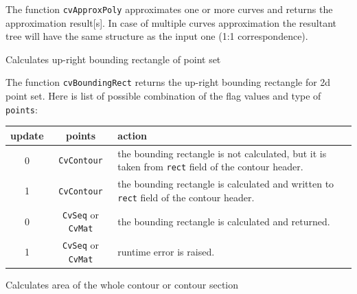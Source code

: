 The function \texttt{cvApproxPoly} approximates one or more curves and returns the approximation result[s]. In case of multiple curves approximation the resultant tree will have the same structure as the input one (1:1 correspondence).

\label{BoundingRect}

Calculates up-right bounding rectangle of point set


\begin{description}
\end{description}

The function \texttt{cvBoundingRect} returns the up-right bounding rectangle for 2d point set.
Here is list of possible combination of the flag values and type of \texttt{points}:

\begin{tabular}{|c|c|p{3in}|}
\hline
update & points & action \\ \hline
0 & \texttt{CvContour\*} & the bounding rectangle is not calculated, but it is taken from \texttt{rect} field of the contour header.\\ \hline
1 & \texttt{CvContour\*} & the bounding rectangle is calculated and written to \texttt{rect} field of the contour header.\\ \hline
0 & \texttt{CvSeq\*} or \texttt{CvMat\*} & the bounding rectangle is calculated and returned.\\ \hline
1 & \texttt{CvSeq\*} or \texttt{CvMat\*} & runtime error is raised.\\ \hline
\end{tabular}

\label{ContourArea}

Calculates area of the whole contour or contour section


\begin{description}
\end{description}

